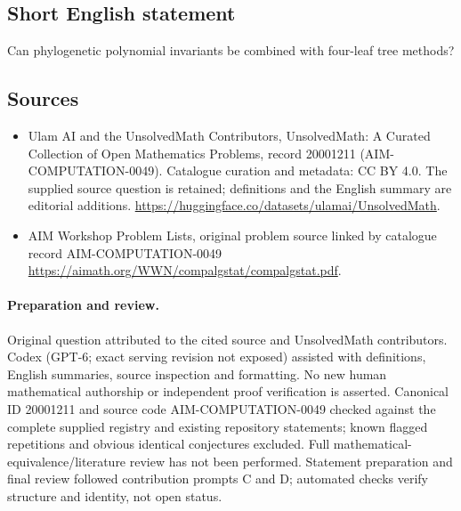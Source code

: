 \documentclass[11pt]{article}
\begin{document}
\subsection{Short English statement}
Can phylogenetic polynomial invariants be combined with four-leaf tree methods?
\subsection{Sources}
\begin{itemize}
\item[\hypertarget{source:20001211:1}{S1}] Ulam AI and the UnsolvedMath Contributors, UnsolvedMath: A Curated Collection of Open Mathematics Problems, record 20001211 (AIM-COMPUTATION-0049). Catalogue curation and metadata: CC BY 4.0. The supplied source question is retained; definitions and the English summary are editorial additions.
\url{https://huggingface.co/datasets/ulamai/UnsolvedMath}.
\item[\hypertarget{source:20001211:2}{S2}] AIM Workshop Problem Lists, original problem source linked by catalogue record AIM-COMPUTATION-0049
\url{https://aimath.org/WWN/compalgstat/compalgstat.pdf}.
\end{itemize}
\paragraph{Preparation and review.}
Original question attributed to the cited source and UnsolvedMath contributors. Codex (GPT-6; exact serving revision not exposed) assisted with definitions, English summaries, source inspection and formatting. No new human mathematical authorship or independent proof verification is asserted. Canonical ID 20001211 and source code AIM-COMPUTATION-0049 checked against the complete supplied registry and existing repository statements; known flagged repetitions and obvious identical conjectures excluded. Full mathematical-equivalence/literature review has not been performed. Statement preparation and final review followed contribution prompts C and D; automated checks verify structure and identity, not open status.
\label{end:20001211}
\end{document}
